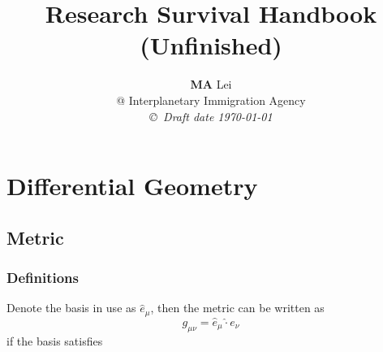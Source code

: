 \documentclass[12pt,a4paper]{book}
\begin{document}
\title{Research Survival Handbook \\ (\textbf{Unfinished})}
\author{{\bf MA} Lei  \\
@ Interplanetary Immigration Agency \\
{\small\em \copyright \ Draft date \today}}
\date{}
\maketitle


\newcommand{\dd}{\mathrm d}
\newenvironment{eqnset}
{\begin{equation}\left \bracevert \begin{array}{l}}
{\end{array} \right. \end{equation}}

\newenvironment{eqn}
{\begin{equation}\left \bracevert \begin{array}{l}}
{\end{array} \right. \end{equation}}










\section{Differential Geometry}

\subsection{Metric}

\subsubsection{Definitions}

Denote the basis in use as $\hat e_\mu$, then the metric can be written as
\begin{equation}
g_{\mu\nu}=\hat e_\mu \hat \cdot e_\nu
\end{equation}
if the basis satisfies
\end{document}
